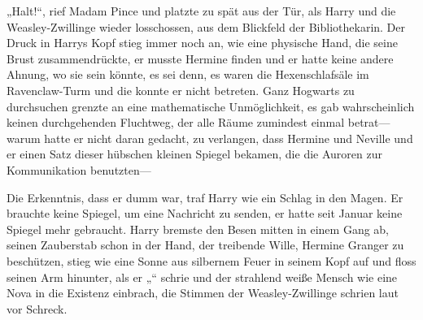 „Halt!“, rief Madam Pince und platzte zu spät aus der Tür, als Harry und die Weasley-Zwillinge wieder losschossen, aus dem Blickfeld der Bibliothekarin.
Der Druck in Harrys Kopf stieg immer noch an, wie eine physische Hand, die seine Brust zusammendrückte, er musste Hermine finden und er hatte keine andere Ahnung, wo sie sein könnte, es sei denn, es waren die Hexenschlafsäle im Ravenclaw-Turm und die konnte er nicht betreten. Ganz Hogwarts zu durchsuchen grenzte an eine mathematische Unmöglichkeit, es gab wahrscheinlich keinen durchgehenden Fluchtweg, der alle Räume zumindest einmal betrat—warum hatte er nicht daran gedacht, zu verlangen, dass Hermine und Neville und er einen Satz dieser hübschen kleinen Spiegel bekamen, die die Auroren zur Kommunikation benutzten—

Die Erkenntnis, dass er dumm war, traf Harry wie ein Schlag in den Magen. Er brauchte keine Spiegel, um eine Nachricht zu senden, er hatte seit Januar keine Spiegel mehr gebraucht. Harry bremste den Besen mitten in einem Gang ab, seinen Zauberstab schon in der Hand, der treibende Wille, Hermine Granger zu beschützen, stieg wie eine Sonne aus silbernem Feuer in seinem Kopf auf und floss seinen Arm hinunter, als er „“ schrie und der strahlend weiße Mensch wie eine Nova in die Existenz einbrach, die Stimmen der Weasley-Zwillinge schrien laut vor Schreck.

